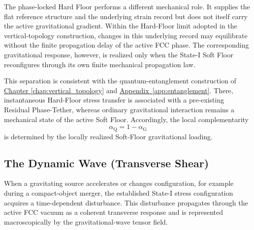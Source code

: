 The phase-locked Hard Floor performs a different mechanical role. It supplies the flat reference structure and the underlying strain record but does not itself carry the active gravitational gradient. Within the Hard-Floor limit adopted in the vertical-topology construction, changes in this underlying record may equilibrate without the finite propagation delay of the active FCC phase. The corresponding gravitational response, however, is realized only when the State-I Soft Floor reconfigures through its own finite mechanical propagation law.

This separation is consistent with the quantum-entanglement construction of \hyperref[chap:vertical_topology]{Chapter \ref*{chap:vertical_topology}} and \hyperref[app:entanglement]{Appendix~\ref*{app:entanglement}}. There, instantaneous Hard-Floor stress transfer is associated with a pre-existing Residual Phase-Tether, whereas ordinary gravitational interaction remains a mechanical state of the active Soft Floor. Accordingly, the local complementarity
\begin{equation}
    \alpha_{\mathrm{Q}} = 1 - \alpha_{\mathrm{G}}
\end{equation}
is determined by the locally realized Soft-Floor gravitational loading.

\subsection{The Dynamic Wave (Transverse Shear)}
\label{subsec:dynamic_wave}

When a gravitating source accelerates or changes configuration, for example during a compact-object merger, the established State-I stress configuration acquires a time-dependent disturbance. This disturbance propagates through the active FCC vacuum as a coherent transverse response and is represented macroscopically by the gravitational-wave tensor field.

